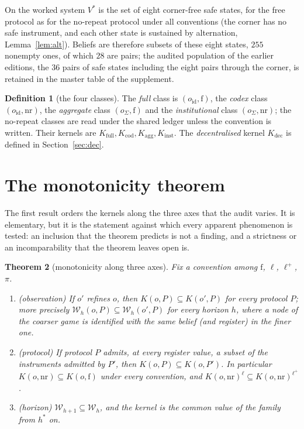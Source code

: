 \documentclass[11pt,a4paper]{article}
\theoremstyle{plain}
\newtheorem{theorem}{Theorem}[section]
\theoremstyle{definition}
\newtheorem{definition}[theorem]{Definition}
\theoremstyle{remark}
\newcommand{\calW}{\mathcal{W}}
\newcommand{\Vstar}{V^{\ast}}
\newcommand{\led}{\ell}
\newcommand{\priv}{\pi}
\newcommand{\opt}{\ell^{+}}
\newcommand{\free}{\mathrm{f}}
\newcommand{\nr}{\mathrm{nr}}
\newcommand{\ofull}{o_{\mathrm{id}}}
\newcommand{\oagg}{o_{\Sigma}}
\newcommand{\Kinst}{K_{\mathrm{inst}}}
\newcommand{\Kagg}{K_{\mathrm{agg}}}
\newcommand{\Kcod}{K_{\mathrm{cod}}}
\newcommand{\Kfull}{K_{\mathrm{full}}}
\newcommand{\Kdec}{K_{\mathrm{dec}}}
\begin{document}
On the worked system $\Vstar$ is the set of eight corner-free safe states, for the free protocol as for the no-repeat protocol under all conventions (the corner has no safe instrument, and each other state is sustained by alternation, Lemma~\ref{lem:alt}). Beliefs are therefore subsets of these eight states, $255$ nonempty ones, of which $28$ are pairs; the audited population of the earlier editions, the $36$ pairs of safe states including the eight pairs through the corner, is retained in the master table of the supplement.

\begin{definition}[the four classes]\label{def:classes}
The \emph{full} class is $(\ofull,\free)$, the \emph{codex} class $(\ofull,\nr)$, the \emph{aggregate} class $(\oagg,\free)$ and the \emph{institutional} class $(\oagg,\nr)$; the no-repeat classes are read under the shared ledger unless the convention is written. Their kernels are $\Kfull,\Kcod,\Kagg,\Kinst$. The \emph{decentralised} kernel $\Kdec$ is defined in Section~\ref{sec:dec}.
\end{definition}
\section{The monotonicity theorem}\label{sec:mono}

The first result orders the kernels along the three axes that the audit varies. It is elementary, but it is the statement against which every apparent phenomenon is tested: an inclusion that the theorem predicts is not a finding, and a strictness or an incomparability that the theorem leaves open is.

\begin{theorem}[monotonicity along three axes]\label{thm:mono}
Fix a convention among $\free$, $\led$, $\opt$, $\priv$.
\begin{enumerate}[label=(\roman*),leftmargin=2em,itemsep=1pt]
\item (\emph{observation}) If $o'$ refines $o$, then $K(o,P)\subseteq K(o',P)$ for every protocol $P$; more precisely $\calW_h(o,P)\subseteq\calW_h(o',P)$ for every horizon $h$, where a node of the coarser game is identified with the same belief (and register) in the finer one.
\item (\emph{protocol}) If protocol $P$ admits, at every register value, a subset of the instruments admitted by $P'$, then $K(o,P)\subseteq K(o,P')$. In particular $K(o,\nr)\subseteq K(o,\free)$ under every convention, and $K(o,\nr)^{\led}\subseteq K(o,\nr)^{\opt}$.
\item (\emph{horizon}) $\calW_{h+1}\subseteq\calW_h$, and the kernel is the common value of the family from $h^{\ast}$ on.
\end{enumerate}
\end{theorem}
\end{document}
